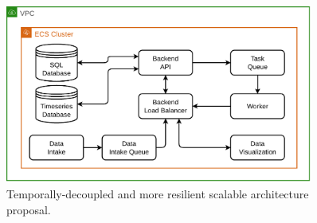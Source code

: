 \begin{figure}[!htbp]
    \centering
    \includegraphics[width=0.90\textwidth]{img/diagrams/pdf/new-arch-queues.drawio.pdf}
    \caption[New Architecture Scalable and Resilient]{Temporally-decoupled and more resilient scalable architecture proposal.}
    \label{fig:new-arch-queues}
\end{figure}
